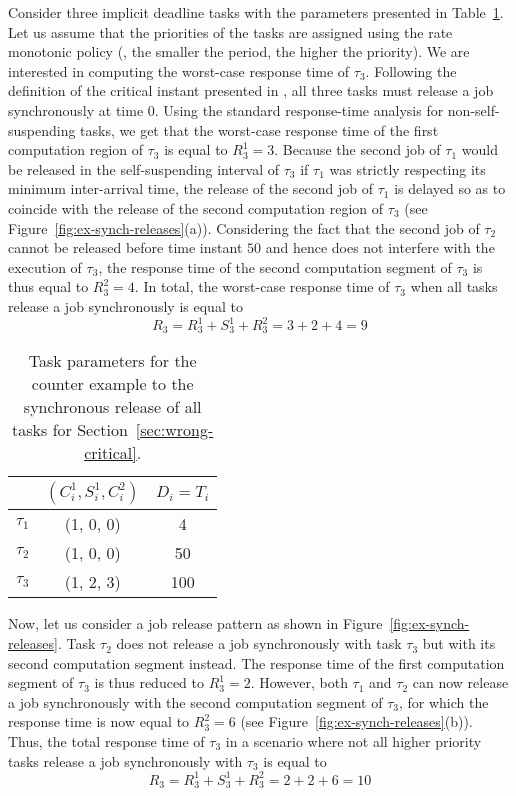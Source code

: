 Consider three implicit deadline tasks with the parameters presented in Table~\ref{table:ex-synch-releases}. Let us assume that the priorities of the tasks are assigned using the rate monotonic policy (\ie, the smaller the period, the higher the priority). We are interested in computing the worst-case response time of $\tau_3$. Following the definition of the critical instant presented in \cite{LR:rtas10}, all three tasks must release a job synchronously at time $0$. Using the standard response-time analysis for non-self-suspending tasks, we get that the worst-case response time of the first computation region of $\tau_3$ is equal to $R_3^1 = 3$. Because the second job of $\tau_1$ would be released in the self-suspending interval of $\tau_3$ if $\tau_1$ was strictly respecting its minimum inter-arrival time, the release of the second job of $\tau_1$ is delayed so as to coincide with the release of the second computation region of $\tau_3$ (see Figure~\ref{fig:ex-synch-releases}(a)). Considering the fact that the second job of $\tau_2$ cannot be released before time instant $50$ and hence does not interfere with the execution of $\tau_3$, the response time of the second computation segment of $\tau_3$ is thus equal to $R_3^2=4$. In total, the worst-case response time of $\tau_3$ when all tasks release a job synchronously is equal to 
$$R_3 = R_3^1 + S_3^1 + R_3^2 = 3 + 2 +4 = 9$$

\begin{table}[t] 
\centering
    \begin{tabular}{|c|c|c|}
 \hline
        & $(C_i^1, S_i^1, C_i^2)$ &  $D_i=T_i$\\ 
        \hline
        $\tau_1$ & (1, 0, 0) &  4\\ 
        $\tau_2$ &  (1, 0, 0) & 50  \\ 
        $\tau_3$ & (1, 2, 3) & 100  \\
        \hline
    \end{tabular} 
    \caption{Task parameters for the counter example to the synchronous release of all tasks for Section~\ref{sec:wrong-critical}.}
    \label{table:ex-synch-releases}
\end{table}

Now, let us consider a job release pattern as shown in Figure~\ref{fig:ex-synch-releases}. Task $\tau_2$ does not release a job synchronously with task $\tau_3$ but with its second computation segment instead. The response time of the first computation segment of $\tau_3$ is thus reduced to $R_3^1=2$. However, both $\tau_1$ and $\tau_2$ can now release a job synchronously with the second computation segment of $\tau_3$, for which the response time is now equal to $R_3^2=6$ (see Figure~\ref{fig:ex-synch-releases}(b)). Thus, the total response time of $\tau_3$ in a scenario where not all higher priority tasks release a job synchronously with $\tau_3$ is equal to 
$$R_3 = R_3^1 + S_3^1 + R_3^2 = 2+2+6 = 10$$


